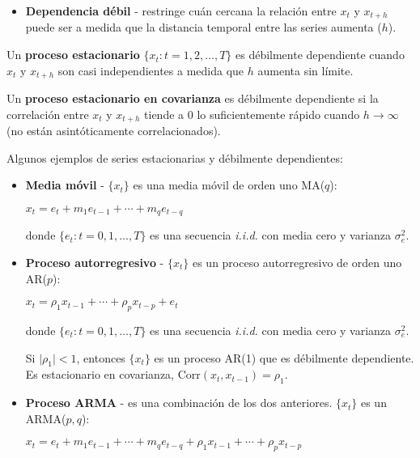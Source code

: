 \documentclass[10pt, a4paper, landscape]{extarticle}
\newcommand{\Corr}{\mathrm{Corr}}
\begin{document}
\begin{multicols}{3}
\begin{itemize}[leftmargin=*]
	\item \textbf{Dependencia débil} - restringe cuán cercana la relación entre $x_t$ y $x_{t+h}$ puede ser a medida que la distancia temporal entre las series aumenta ($h$).
\end{itemize}

Un \textbf{proceso estacionario} $\lbrace x_t : t = 1, 2, \ldots, T \rbrace$ es débilmente dependiente cuando $x_t$ y $x_{t + h}$ son casi independientes a medida que $h$ aumenta sin límite.

Un \textbf{proceso estacionario en covarianza} es débilmente dependiente si la correlación entre $x_t$ y $x_{t + h}$ tiende a $0$ lo suficientemente rápido cuando $h \rightarrow \infty$ (no están asintóticamente correlacionados).

Algunos ejemplos de series estacionarias y débilmente dependientes:

\begin{itemize}[leftmargin=*]
	\item \textbf{Media móvil} - $\lbrace x_t \rbrace$ es una media móvil de orden uno MA($q$):
	\begin{center}
		$x_t = e_t + m_1 e_{t - 1} + \cdots + m_q e_{t - q}$
	\end{center}
	donde $\lbrace e_t : t = 0, 1, \ldots, T \rbrace$ es una secuencia \textsl{i.i.d.} con media cero y varianza $\sigma^2_e$.
	\item \textbf{Proceso autorregresivo} - $\lbrace x_t \rbrace$ es un proceso autorregresivo de orden uno AR($p$):
	\begin{center}
		$x_t = \rho_1 x_{t - 1} + \cdots + \rho_p x_{t - p} + e_t$
	\end{center}
	donde $\lbrace e_t: t = 0, 1, \ldots, T \rbrace$ es una secuencia \textsl{i.i.d.} con media cero y varianza $\sigma^2_e$.

	Si $\lvert \rho_1 \rvert < 1$, entonces $\lbrace x_t \rbrace$ es un proceso AR(1) que es débilmente dependiente. Es estacionario en covarianza, $\Corr(x_t, x_{t - 1}) = \rho_1$.
	\item \textbf{Proceso ARMA} - es una combinación de los dos anteriores. $\lbrace x_t \rbrace$ es un ARMA($p, q$):
	\begin{center}
		$x_t = e_t + m_1 e_{t - 1} + \cdots + m_q e_{t - q} + \rho_1 x_{t - 1} + \cdots + \rho_p x_{t - p}$
	\end{center}
\end{itemize}


\end{multicols}
\end{document}
